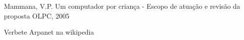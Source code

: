 \documentclass[
12pt,		%
openright,	%
twoside,  %
a4paper,			%
chapter=TITLE,		%
english,			%
french,				%
spanish,			%
brazil				%
]{USPSC-classe/USPSC}
\begin{document}
\begin{flushleft}
\begin{flushleft}
\begin{flushleft}
\begin{flushleft}
\begin{flushleft}
\begin{flushleft}
\begin{flushleft}
\begin{flushleft}
\begin{flushleft}
[MAMMANA, 2005a] Mammana, V.P. Um computador por crian\c{c}a - Escopo de atua\c{c}\~ao e revis\~ao da proposta OLPC, 2005
\end{flushleft}


\end{flushleft}


\end{flushleft}


\end{flushleft}


\end{flushleft}


\end{flushleft}


\end{flushleft}


\end{flushleft}


\end{flushleft}


\begin{flushleft}
\begin{flushleft}
\begin{flushleft}
\begin{flushleft}
\begin{flushleft}
\begin{flushleft}
\begin{flushleft}
\begin{flushleft}
\begin{flushleft}
[ARPANET, 2022] Verbete Arpanet na wikipedia
\end{flushleft}


\end{flushleft}


\end{flushleft}


\end{flushleft}


\end{flushleft}


\end{flushleft}


\end{flushleft}


\end{flushleft}


\end{flushleft}
\end{document}
